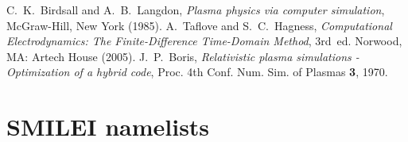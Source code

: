 \documentclass[11pt,a4paper]{article}
\begin{document}

\begin{thebibliography}{2}

 C.~K.~Birdsall and A.~B.~Langdon, {\it Plasma physics via computer simulation}, McGraw-Hill, New York (1985).
 A.~Taflove and S.~C.~Hagness, {\it Computational Electrodynamics: The Finite-Difference Time-Domain Method}, 3rd~ed. Norwood, MA: Artech House (2005).
 J.~P.~Boris, {\it Relativistic plasma simulations - Optimization of a hybrid code}, Proc. 4th Conf. Num. Sim. of Plasmas {\bf 3}, 1970.


\end{thebibliography}

\vfill\eject

\section*{SMILEI namelists}


\end{document}
